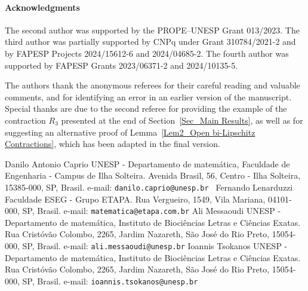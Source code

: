 \documentclass[a4paper, 12pt]{article}
\theoremstyle{definition}
\begin{document}
	
	
	
	
	
	
	
	
	
	
	
	
	
	
	
	
	
	
	
	\paragraph{Acknowledgments}
	The second author was supported by the PROPE–UNESP Grant 013/2023. The third author was partially supported by CNPq under Grant 310784/2021-2 and by FAPESP Projects  2024/15612-6 and 2024/04685-2. The fourth author was supported by FAPESP Grants 2023/06371-2 and 2024/10135-5.
	
	The authors thank the anonymous referees for their careful reading and valuable comments, and for identifying an error in an earlier version of the manuscript. Special thanks are due to the second referee for providing the example of the contraction $R_{3}$ presented at the end of Section~\ref{Sec_Main Results}, as well as for suggesting an alternative proof of Lemma~\ref{Lem2_Open bi-Lipschitz Contractions}, which has been adapted in the final version.
	
	
	
	\vspace{1em}
	\noindent
	Danilo Antonio Caprio
	\newline
	UNESP -  Departamento de matem\'atica,
	Faculdade de Engenharia - Campus de Ilha Solteira.
	\newline Avenida Brasil, 56, Centro - Ilha Solteira, 15385-000, SP, Brasil.
	\newline
	e-mail: {\rm \texttt{danilo.caprio@unesp.br }}
	\newline
	\newline
	Fernando Lenarduzzi 
	\newline
	Faculdade ESEG - Grupo ETAPA. 
	\newline Rua Vergueiro, 1549, Vila Mariana, 04101-000, SP, Brasil. 
	\newline 
	e-mail: {\rm \texttt{matematica@etapa.com.br}}
	\newline 
	\newline
	Ali Messaoudi
	\newline
	UNESP - Departamento de matem\'atica, Instituto de Bioci\^encias Letras e Ci\^encias Exatas.
	\newline Rua Crist\'ov\~ao Colombo, 2265, Jardim Nazareth, S\~ao Jos\'e do Rio Preto, 15054-000, SP, Brasil.
	\newline
	e-mail: {\rm \texttt{ali.messaoudi@unesp.br}}
	\newline
	\newline
	Ioannis Tsokanos
	\newline
	UNESP - Departamento de matem\'atica, Instituto de Bioci\^encias Letras e Ci\^encias Exatas.
	\newline 
	Rua Crist\'ov\~ao Colombo, 2265, Jardim Nazareth, S\~ao Jos\'e do Rio Preto, 
	15054-000, SP, Brasil. 
	\newline
	e-mail: {\rm \texttt{ioannis.tsokanos@unesp.br }}
	
\end{document}
